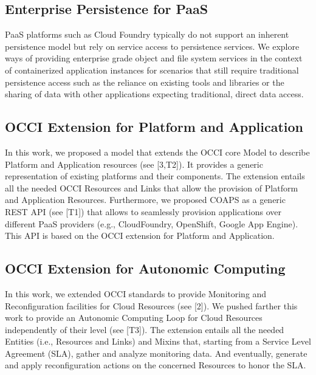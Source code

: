 \documentclass[11pt,a4paper,sans]{moderncv}   %
\begin{document}
\subsection{Enterprise Persistence for PaaS}
PaaS platforms such as Cloud Foundry typically do not support an inherent persistence model but rely on service access to persistence services. We 
explore ways of providing enterprise grade object and file system services in the context of containerized application instances for scenarios that 
still require traditional persistence access such as the reliance on existing tools and libraries or the sharing of data with other applications 
expecting traditional, direct data access.
\subsection{OCCI Extension for Platform and Application}
In this work, we proposed a model that extends the OCCI core Model to describe Platform and Application resources (see [3,T2]). It provides a generic representation of existing platforms and their components. The extension entails all the needed OCCI Resources and Links that allow the provision of Platform and Application Resources. Furthermore, we proposed COAPS as a generic REST API (see [T1]) that allows to seamlessly provision applications over different PaaS providers (e.g., CloudFoundry, OpenShift, Google App Engine). This API is based on the OCCI extension for Platform and Application. 
\subsection{OCCI Extension for Autonomic Computing}
 In this work, we extended OCCI standards to provide Monitoring and Reconfiguration facilities for Cloud Resources (see [2]). We pushed farther this work to provide an Autonomic Computing Loop for Cloud Resources independently of their level (see [T3]). The extension entails all the needed Entities (i.e., Resources and Links) and Mixins that, starting from a Service Level Agreement (SLA), gather and analyze monitoring data. And eventually, generate and apply reconfiguration actions on the concerned Resources to honor the SLA.
\end{document}
